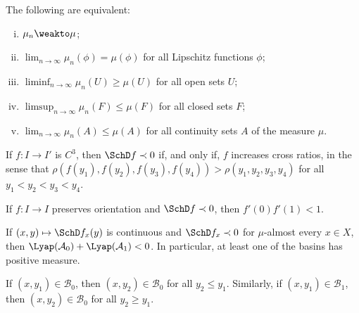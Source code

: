 \documentclass[../main.tex]{subfiles}
\begin{document}
\begin{proposition}[Portmanteau]\label{thm:portmanteau}
  The following are equivalent:
  \begin{enumerate}[i., left=0pt, topsep=3pt]
    \item \(\mu_n \weakto \mu\);
    \item \(\lim_{n \to \infty} \mu_n(\phi) = \mu(\phi)\) for all Lipschitz functions \(\phi\);
    \item \(\liminf_{n \to \infty} \mu_n(U) \geq \mu(U)\) for all open sets \(U\);
    \item \(\limsup_{n \to \infty} \mu_n(F) \leq \mu(F)\) for all closed sets \(F\);
    \item \(\lim_{n \to \infty} \mu_n(A) \leq \mu(A)\) for all continuity sets \(A\) of the measure \(\mu\).
  \end{enumerate}
\end{proposition}

\begin{lemma}\label{lem:sch-cross-increase}
  If \(f \colon I \to I'\) is \(C^3\), then \(\SchD f \prec 0\) if, and only if, \(f\) increases cross ratios, in the sense that \(\rho(f(y_{1}),f(y_2),f(y_3),f(y_4)) > \rho(y_{1},y_2,y_3,y_4)\) for all \(y_1 < y_2 < y_3 < y_{4}\).
\end{lemma}

\begin{lemma}
  If \(f \colon I \to I\) preserves orientation and \(\SchD f \prec 0\), then \(f'(0)f'(1) < 1\).
\end{lemma}

\begin{corollary}\label{cor:schwarz-basin-pos-meas}
  If \((x,y) \mapsto \SchD f_x(y)\) is continuous and \(\SchD f_x \prec 0\) for \(\mu\)-almost every \(x \in X\), then \(\Lyap(\mathcal{A}_0) + \Lyap(\mathcal{A}_1) < 0\).
  In particular, at least one of the basins has positive measure.
\end{corollary}

\begin{lemma}\label{lem:basin-segment}
  If \((x, y_1) \in \mathcal{B}_0\), then \((x,y_2) \in \mathcal{B}_0\) for all \(y_2 \leq y_1\). Similarly, if \((x, y_1) \in \mathcal{B}_1\), then \((x,y_2) \in \mathcal{B}_0\) for all \(y_2 \geq y_1\).
\end{lemma}
\end{document}
